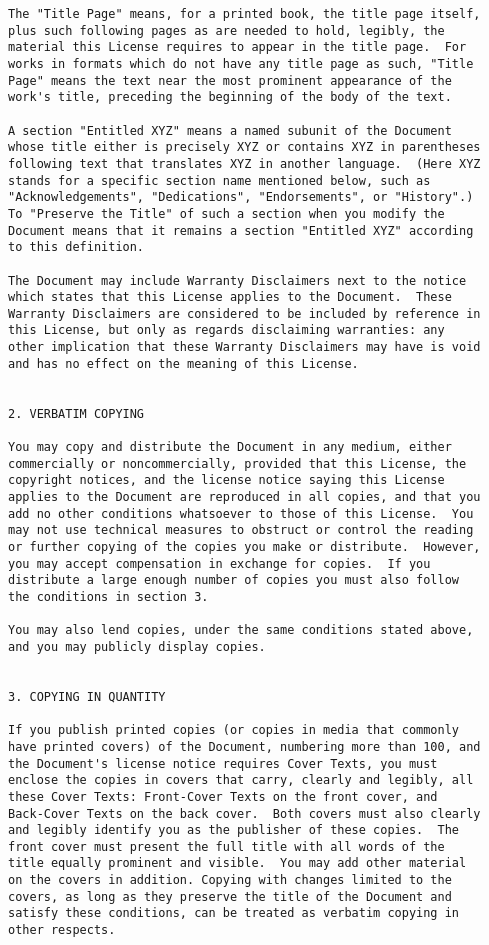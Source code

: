 \begin{verbatim}
The "Title Page" means, for a printed book, the title page itself,
plus such following pages as are needed to hold, legibly, the
material this License requires to appear in the title page.  For
works in formats which do not have any title page as such, "Title
Page" means the text near the most prominent appearance of the
work's title, preceding the beginning of the body of the text.

A section "Entitled XYZ" means a named subunit of the Document
whose title either is precisely XYZ or contains XYZ in parentheses
following text that translates XYZ in another language.  (Here XYZ
stands for a specific section name mentioned below, such as
"Acknowledgements", "Dedications", "Endorsements", or "History".)
To "Preserve the Title" of such a section when you modify the
Document means that it remains a section "Entitled XYZ" according
to this definition.

The Document may include Warranty Disclaimers next to the notice
which states that this License applies to the Document.  These
Warranty Disclaimers are considered to be included by reference in
this License, but only as regards disclaiming warranties: any
other implication that these Warranty Disclaimers may have is void
and has no effect on the meaning of this License.


2. VERBATIM COPYING

You may copy and distribute the Document in any medium, either
commercially or noncommercially, provided that this License, the
copyright notices, and the license notice saying this License
applies to the Document are reproduced in all copies, and that you
add no other conditions whatsoever to those of this License.  You
may not use technical measures to obstruct or control the reading
or further copying of the copies you make or distribute.  However,
you may accept compensation in exchange for copies.  If you
distribute a large enough number of copies you must also follow
the conditions in section 3.

You may also lend copies, under the same conditions stated above,
and you may publicly display copies.


3. COPYING IN QUANTITY

If you publish printed copies (or copies in media that commonly
have printed covers) of the Document, numbering more than 100, and
the Document's license notice requires Cover Texts, you must
enclose the copies in covers that carry, clearly and legibly, all
these Cover Texts: Front-Cover Texts on the front cover, and
Back-Cover Texts on the back cover.  Both covers must also clearly
and legibly identify you as the publisher of these copies.  The
front cover must present the full title with all words of the
title equally prominent and visible.  You may add other material
on the covers in addition. Copying with changes limited to the
covers, as long as they preserve the title of the Document and
satisfy these conditions, can be treated as verbatim copying in
other respects.


\end{verbatim}
